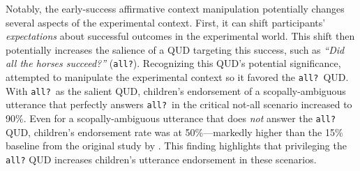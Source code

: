 \documentclass[10pt,a4paper]{article}
\newcommand{\gcs}[1]{\textcolor{blue}{[gcs: #1]}}
\begin{document}


Notably, the early-success affirmative context manipulation  potentially changes several aspects of the experimental context.  
First, it can shift participants' \textit{expectations} about successful outcomes in the experimental world.
This shift then potentially increases the salience of a {QUD} targeting this success, such as \textit{``Did all the horses succeed?''} (\texttt{all?}). 
Recognizing this QUD's potential significance,  attempted to manipulate the experimental context so it favored the \texttt{all?}~{QUD}.
With \texttt{all?}~as the salient QUD, children's endorsement of a scopally-ambiguous utterance that perfectly answers \texttt{all?}~in the critical {not-all} scenario increased to 90\%.  
Even for a scopally-ambiguous utterance that does \textit{not} answer the \texttt{all?} QUD, children's endorsement rate was at 50\%---markedly higher than the 15\% baseline from the original study by .
This finding highlights that privileging the \texttt{all?} QUD increases children's utterance endorsement in these scenarios.
 

\end{document}
